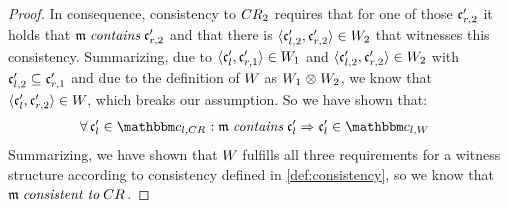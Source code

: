 \begin{proof}
    In consequence, consistency to $\consistencyrelation{CR}{2}$ requires that for one of those $\conditionelement{c}{r,2}'$ it holds that $\modeltuple{m} \containsmath \conditionelement{c}{r,2}'$ and that there is $\tupled{\conditionelement{c}{l,2}', \conditionelement{c}{r,2}'} \in \consistencyrelation{W}{2}$ that witnesses this consistency.
    Summarizing, due to $\tupled{\conditionelement{c}{l}', \conditionelement{c}{r,1}'} \in \consistencyrelation{W}{1}$ and $\tupled{\conditionelement{c}{l,2}', \conditionelement{c}{r,2}'} \in \consistencyrelation{W}{2}$ with $\conditionelement{c}{l,2}' \subseteq \conditionelement{c}{r,1}'$ and due to the definition of $\consistencyrelation{W}{}$ as $\consistencyrelation{W}{1} \concat \consistencyrelation{W}{2}$, we know that $\tupled{\conditionelement{c}{l}', \conditionelement{c}{r,2}'} \in \consistencyrelation{W}{}$, which breaks our assumption.
    So we have shown that:
    \begin{align*}
        &
        \forall \conditionelement{c}{l}' \in \condition{c}{l,\consistencyrelation{CR}{}} : \modeltuple{m} \containsmath \conditionelement{c}{l}' \Rightarrow \conditionelement{c}{l}' \in \condition{c}{l,\consistencyrelation{W}{}}
    \end{align*}
    Summarizing, we have shown that $\consistencyrelation{W}{}$ fulfills all three requirements for a witness structure according to consistency defined in \autoref{def:consistency}, so we know that $\modeltuple{m} \consistenttomath \consistencyrelation{CR}{}$.

\end{proof}
